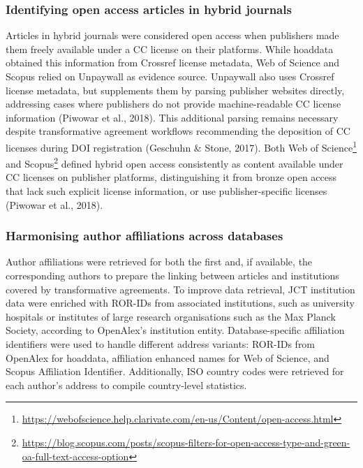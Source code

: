 \documentclass[a4paper,man,floatsintext,longtable,noextraspace,10pt]{apa6}
\begin{document}
\subsubsection{Identifying open access articles in hybrid
journals}\label{identifying-open-access-articles-in-hybrid-journals}

Articles in hybrid journals were considered open access when publishers
made them freely available under a CC license on their platforms. While
hoaddata obtained this information from Crossref license metadata, Web
of Science and Scopus relied on Unpaywall as evidence source. Unpaywall
also uses Crossref license metadata, but supplements them by parsing
publisher websites directly, addressing cases where publishers do not
provide machine-readable CC license information (Piwowar et al., 2018).
This additional parsing remains necessary despite transformative
agreement workflows recommending the deposition of CC licenses during
DOI registration (Geschuhn \& Stone, 2017). Both Web of
Science\footnote{\url{https://webofscience.help.clarivate.com/en-us/Content/open-access.html}}
and Scopus\footnote{\url{https://blog.scopus.com/posts/scopus-filters-for-open-access-type-and-green-oa-full-text-access-option}}
defined hybrid open access consistently as content available under CC
licenses on publisher platforms, distinguishing it from bronze open
access that lack such explicit license information, or use
publisher-specific licenses (Piwowar et al., 2018).

\subsubsection{Harmonising author affiliations across
databases}\label{harmonising-author-affiliations-across-databases}

Author affiliations were retrieved for both the first and, if available,
the corresponding authors to prepare the linking between articles and
institutions covered by transformative agreements. To improve data
retrieval, JCT institution data were enriched with ROR-IDs from
associated institutions, such as university hospitals or institutes of
large research organisations such as the Max Planck Society, according
to OpenAlex's institution entity. Database-specific affiliation
identifiers were used to handle different address variants: ROR-IDs from
OpenAlex for hoaddata, affiliation enhanced names for Web of Science,
and Scopus Affiliation Identifier. Additionally, ISO country codes were
retrieved for each author's address to compile country-level statistics.
\end{document}
